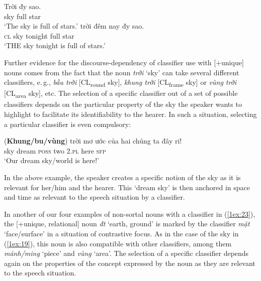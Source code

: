 \documentclass[output=paper]{langsci/langscibook}
\begin{document}
\begin{exe}
\ex\label{1ex:18}
	\begin{xlista}
	\ex\label{1ex:18a}
	\gll Trời  đ{\daab}y  sao. \\
		sky   full  star \\
	\glt `The sky is full of stars.'
	\ex\label{1ex:18b}
	  trời  {đêm nay}  đ{\daab}y  sao. \\
		{\textsc{cl}}   sky   tonight    full  star \\
	\glt `THE sky tonight is full of stars.'
	\end{xlista}
\end{exe}

{
Further evidence for the discourse-dependency of classifier use with [+unique] nouns comes
from the fact that the noun {\emph{trời}} `sky' can take several different classifiers, e.\,g., {\emph{bầu trời}} [CL\textsubscript{round} sky], {\emph{khung trời}} [CL\textsubscript{frame} sky] or {\emph{vùng trời}} [CL\textsubscript{area} sky], etc. The selection of a specific classifier out of a set of possible classifiers depends on the particular property of the sky the speaker wants to highlight to facilitate its identifiability to the hearer. In such a situation, selecting a particular classifier is even compulsory:
}

\begin{exe}
\ex\label{1ex:19}
\gll *({\textbf{Khung/b{\daab}u/vùng}}) trời  {mơ ước}  của     hai   {chúng ta}  đây   r{\daob}i! \\
  sky  dream    {\textsc{poss}}  two   2.{\textsc{pl}}       here  {\textsc{sfp}}\\
\glt `Our dream sky/world is here!'
\end{exe}

In the above example, the speaker creates a specific notion of the sky as it is relevant for her/him and the hearer. This `dream sky' is then anchored in space and time as relevant to the speech situation by a classifier.

{
In another of our four examples of non-sortal nouns with a classifier in (\ref{1ex:23}), the [+unique, \minus relational] noun {\emph{đ{\daa}t}} `earth, ground' is marked by the classifier {\emph{mặt}} `face/surface' in a situation of contrastive focus. As in the case of the sky in (\ref{1ex:19}), this noun is also compatible with other classifiers, among them {\emph{mảnh/mi{\dae}ng}} `piece' and {\emph{vùng}} `area'. The selection of a specific classifier depends again on the properties of the concept expressed by the noun as they are relevant to the speech situation.
}
\end{document}
